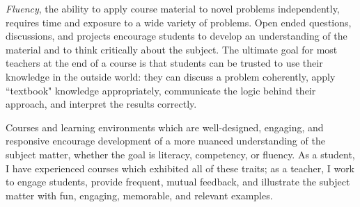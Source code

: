 \documentclass[10.25pt,letterpaper,sans,unicode]{moderncv}        %
\begin{document}
\textit{Fluency}, the ability to apply course material to novel problems independently, requires time and exposure to a wide variety of problems. Open ended questions, discussions, and projects encourage students to develop an understanding of the material and to think critically about the subject. The ultimate goal for most teachers at the end of a course is that students can be trusted to use their knowledge in the outside world: they can discuss a problem coherently, apply ``textbook" knowledge appropriately, communicate the logic behind their approach, and interpret the results correctly. 

\vspace{.25cm}\noindent Courses and learning environments which are well-designed, engaging, and responsive encourage development of a more nuanced understanding of the subject matter, whether the goal is literacy, competency, or fluency. As a student, I have experienced courses which exhibited all of these traits; as a teacher, I work to engage students, provide frequent, mutual feedback, and illustrate the subject matter with fun, engaging, memorable, and relevant examples. 
\end{document}
